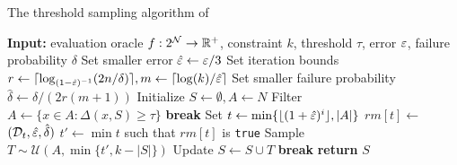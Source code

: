  \begin{algorithm}[t]
  \caption{The threshold sampling algorithm of }
  \label{alg:thresh}
  \begin{algorithmic}[1]
    \State \textbf{Input:} evaluation oracle $f:2^{\mathcal N} \to \mathbb{R}^+$, constraint $k$,
    threshold $\tau$, error $\varepsilon$, failure probability $\delta$
    \State Set smaller error $\hat{\varepsilon} \gets \varepsilon / 3$
    \State Set iteration bounds $r \gets \lceil \log_{(1 - \hat {\varepsilon})^{-1}}(2n / \delta) \rceil, m \gets \lceil \log(k) / \hat {\varepsilon} \rceil$
    \State Set smaller failure probability $\hat \delta \gets \delta / (2r(m + 1))$
    \State Initialize $S \gets \emptyset, A \gets N$
    \State Filter $A \gets \{ x \in A : \Delta (x, S) \ge \tau \}$\label{line:filter}
    \label{line:stopWithA}
    \State \textbf{break}
    \EndIf
    \label{thresh:for}
    \State Set $t \gets \min \{ \lfloor (1 + \hat {\varepsilon})^i \rfloor, |A|\}$
    \State $rm[t] \gets $\reducedmean $( \mathcal D_t, \hat {\varepsilon}, \hat \delta )$ \label{line:Check}
    \EndFor
    \State $t' \gets \min t$ such that $rm[t]$ is \texttt{true}
    \State Sample $T \sim \mathcal U \left( A, \min \{t', k - |S| \} \right)$
    \State Update $S \gets S \cup T$
    \State \textbf{break}
    \EndIf
    \EndFor
    \State \textbf{return} $S$
    \EndProcedure
\end{algorithmic}
\end{algorithm}


